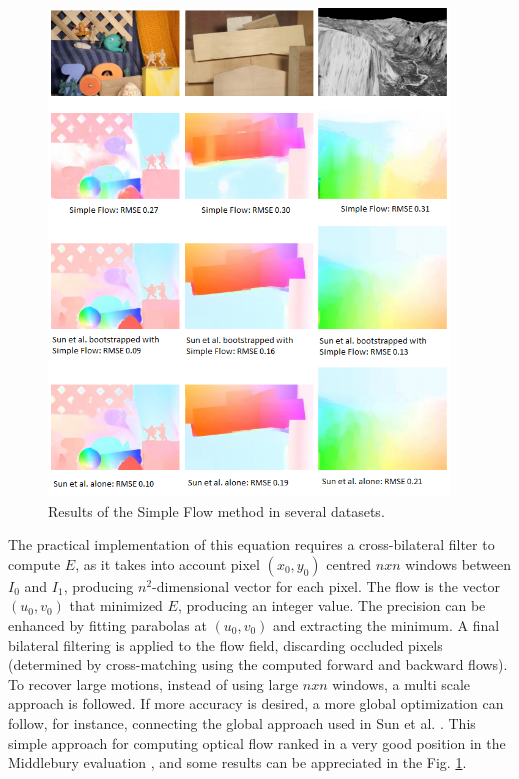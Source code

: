    \begin{figure}[bhp]
      \centering
      \includegraphics[width=0.95\textwidth]{../images/simpleoptflow.png}
      \caption{  Results of the Simple Flow method in several datasets. }
      \label{simple_of}
   \end{figure}

The practical implementation of this equation requires a cross-bilateral filter to compute $E$, as it takes into account 
pixel $(x_0,y_0)$ centred $nxn$ windows between $I_0$ and $I_1$, producing $n^2$-dimensional vector for each pixel. 
The flow is the vector $(u_0, v_0)$ that minimized $E$, producing an integer value. The precision can be enhanced by fitting 
parabolas at  $(u_0, v_0)$ and extracting the minimum. A final bilateral filtering is applied to the flow field, discarding 
occluded pixels (determined by cross-matching using the computed forward and backward flows). 
To recover large motions, instead of using large $nxn$ windows, a multi scale approach is followed. 
If more accuracy is desired, a more global optimization can follow, for instance, connecting the global approach used in Sun et al. \cite{c40}.
This simple approach for computing optical flow ranked in a very good position in the Middlebury evaluation \cite{c17}, 
and some results can be appreciated in the Fig. \ref{simple_of}.



